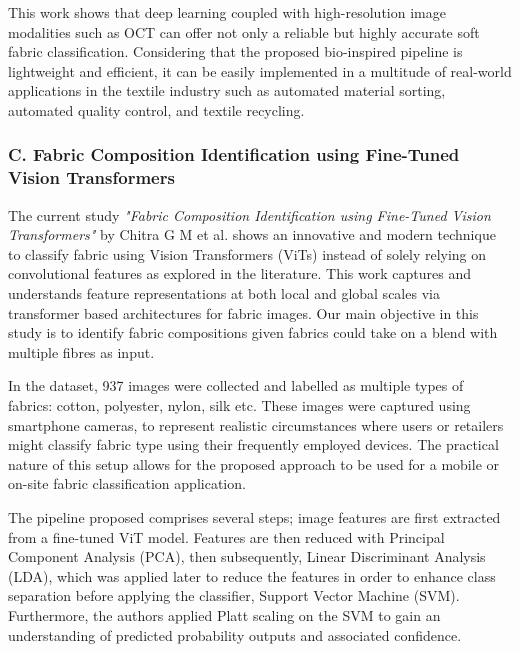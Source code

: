 This work shows that deep learning coupled with high-resolution image modalities such as OCT can offer not only a reliable but highly accurate soft fabric classification. Considering that the proposed bio-inspired pipeline is lightweight and efficient, it can be easily implemented in a multitude of real-world applications in the textile industry such as automated material sorting, automated quality control, and textile recycling.

\subsubsection[C. Fabric Composition Identification using Fine-Tuned Vision Transformers]{C. Fabric Composition Identification using Fine-Tuned Vision Transformers~\cite{chitra2023fabric}}

The current study \textit{"Fabric Composition Identification using Fine-Tuned Vision Transformers"} by Chitra G M et al. shows an innovative and modern technique to classify fabric using Vision Transformers (ViTs) instead of solely relying on convolutional features as explored in the literature. This work captures and understands feature representations at both local and global scales via transformer based architectures for fabric images. Our main objective in this study is to identify fabric compositions given fabrics could take on a blend with multiple fibres as input. 

In the dataset, 937 images were collected and labelled as multiple types of fabrics: cotton, polyester, nylon, silk etc. These images were captured using smartphone cameras, to represent realistic circumstances where users or retailers might classify fabric type using their frequently employed devices. The practical nature of this setup allows for the proposed approach to be used for a mobile or on-site fabric classification application.

The pipeline proposed comprises several steps; image features are first extracted from a fine-tuned ViT model. Features are then reduced with Principal Component Analysis (PCA), then subsequently, Linear Discriminant Analysis (LDA), which was applied later to reduce the features in order to enhance class separation before applying the classifier, Support Vector Machine (SVM). Furthermore, the authors applied Platt scaling on the SVM to gain an understanding of predicted probability outputs and associated confidence.

